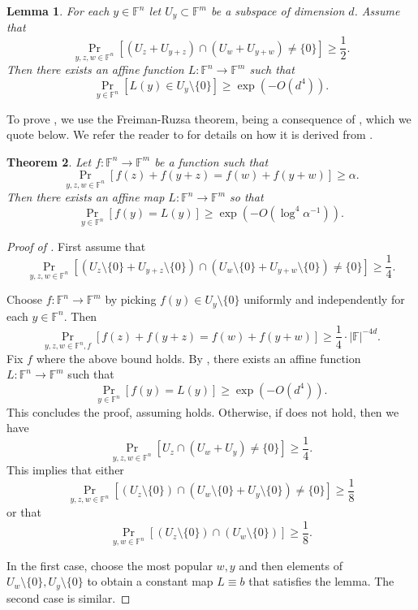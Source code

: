 \documentclass[12pt]{article}
\newcommand{\F}{\mathbb{F}}
\newtheorem{theorem}{Theorem}[section]
\newtheorem{lemma}[theorem]{Lemma}
\begin{document}
\begin{lemma}
\label{lemma:intersect}
For each $y \in \F^n$ let $U_y \subset \F^m$ be a subspace of dimension $d$. Assume that
$$
\Pr_{y,z,w \in \F^n} \left [ \left( U_{z} + U_{y+z} \right) \cap \left( U_{w} + U_{y+w} \right) \ne \{0\} \right] \ge  \frac{1}{2}.
$$
Then there exists an affine function $L:\F^n \to \F^m$ such that
$$
	\Pr_{y \in \F^n} \left[L(y) \in U_y\setminus\{0\}\right] \ge \exp(-O(d^4)).
$$
\end{lemma}
To prove , we use the Freiman-Ruzsa theorem, being a consequence of , which we quote below. We refer the reader to \cite{green2005notes} for details on how it is derived from .


\begin{theorem}\label{theorem:sanders2}
Let $f:\F^n \rightarrow \F^m$ be a function such that
$$
\Pr_{y,z,w \in \F^n} \left[ f(z) + f(y+z) = f(w) + f(y+w) \right] \ge \alpha.
$$
Then there exists an affine map $L:\F^n\rightarrow \F^m$ so that
$$
\Pr_{y \in \F^n} \left[ f(y) = L(y)\right] \ge \exp(-O(\log^4 \alpha^{-1})).
$$
\end{theorem}

\begin{proof}[Proof of ]
 First assume that
	\begin{equation}\label{equation:first}
	\Pr_{y,z,w \in \F^n} \left [ \left( U_{z}\setminus\{0\}+ U_{y+z}\setminus\{0\}\right) \cap \left( U_{w}\setminus\{0\}+ U_{y+w}\setminus\{0\} \right) \ne \{0\} \right] \ge \frac{1}{4}.
	\end{equation}

	Choose $f:\F^n \to \F^m$ by picking $f(y) \in U_y\setminus\{0\}$ uniformly and independently
for each $y \in \F^n$. Then
$$
\Pr_{y,z,w \in \F^n, f} \left[ f(z) + f(y+z) = f(w) + f(y+w) \right] \ge \frac{1}{4} \cdot |\F|^{-4d}.
$$
Fix $f$ where the above bound holds. By , there exists an affine function $L:\F^n \to \F^m$ such that
$$
\Pr_{y \in \F^n} \left[ f(y) = L(y) \right] \ge \exp(-O(d^4)).
$$
This concludes the proof, assuming  holds.
Otherwise, if  does not hold, then we have
\begin{equation*}
\Pr_{y,z,w \in \F^n} \left [ U_{z}  \cap \left( U_{w} + U_{y} \right) \ne \{0\} \right] \ge \frac{1}{4}.
\end{equation*}
This implies that either
\begin{equation*}
	\Pr_{y,z,w \in \F^n} \left [ (U_{z}\setminus\{0\})  \cap \left( U_{w}\setminus\{0\} + U_{y}\setminus\{0\} \right) \ne \{0\} \right] \ge \frac{1}{8}
\end{equation*}
or that
\begin{equation*}
	\Pr_{y,w \in \F^n} \left [ (U_{z}\setminus\{0\})  \cap ( U_{w}\setminus\{0\})  \right] \ge \frac{1}{8}.
\end{equation*}

In the first case, choose the most popular $w,y$ and then elements of $U_w\setminus\{0\},U_y\setminus\{0\}$ to obtain a constant map $L \equiv b$ that satisfies the lemma. The second case is similar.
\end{proof}
\end{document}
